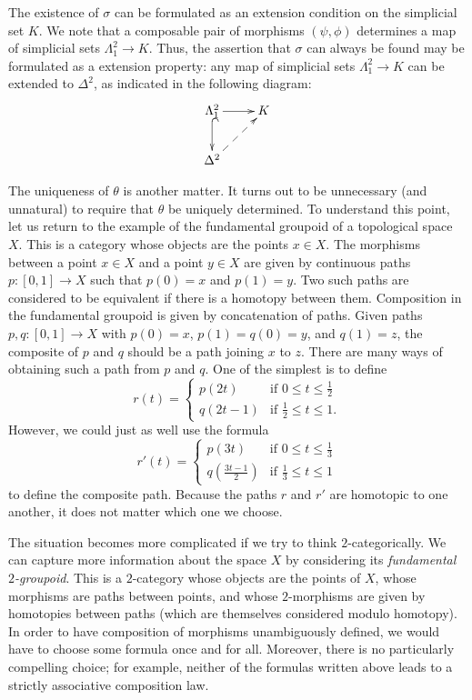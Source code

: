 \begin{1.1.2 inf-Categories}
The existence of $\sigma$ can be formulated as an extension condition on the simplicial set $K$.
We note that a composable pair of morphisms $(\psi, \phi)$ determines a map
of simplicial sets
$\Lambda^2_1 \rightarrow K$. Thus, the assertion that $\sigma$ can
always be found may be formulated as a extension property: any
map of simplicial sets $\Lambda^2_1 \rightarrow K$ can be extended to $\Delta^2$, as indicated in the following diagram:
$$ \xymatrix{ \Lambda^2_1\ar[r]\ar@{^{(}->}[d] & K \\
\Delta^2 \ar@{-->}[ur]}$$

The uniqueness of $\theta$ is another matter. It turns out to be
unnecessary (and unnatural) to require that $\theta$ be uniquely
determined. To understand this point, let us return to 
the example of the fundamental groupoid of a topological space
$X$. This is a category whose objects are the points $x \in X$.
The morphisms between a point $x \in X$ and a point $y \in X$ are given by
continuous paths $p: [0,1] \rightarrow X$ such that $p(0)=x$ and
$p(1)=y$. Two such paths are considered to be equivalent if there
is a homotopy between them. Composition in the fundamental
groupoid is given by concatenation of paths. Given paths $p,q:
[0,1] \rightarrow X$ with $p(0)=x$, $p(1)=q(0)=y$, and $q(1)=z$,
the composite of $p$ and $q$ should be a path joining $x$ to $z$.
There are many ways of obtaining such a path from $p$ and $q$. One
of the simplest is to define
$$r(t) = \begin{cases} p(2t) & \text{if } 0 \leq t \leq \frac{1}{2} \\
q(2t-1) & \text{if } \frac{1}{2} \leq t \leq 1. \end{cases}$$
However, we could just as well use the formula
$$r'(t) = \begin{cases} p(3t) & \text{if } 0 \leq t \leq \frac{1}{3} \\
q(\frac{3t-1}{2}) & \text{if } \frac{1}{3} \leq t \leq 1
\end{cases}$$
to define the composite path. Because the paths $r$ and $r'$ are homotopic to one another, it does not matter which one we choose.

The situation becomes more complicated if we try to think
$2$-categorically. We can capture more information about the space
$X$ by considering its {\it fundamental $2$-groupoid}. This is a
$2$-category whose objects are the points of $X$, whose morphisms
are paths between points, and whose $2$-morphisms are given by
homotopies between paths (which are themselves considered modulo
homotopy). In order to have composition of morphisms unambiguously defined, we would have to choose some formula once and for all.
Moreover, there is no particularly compelling choice; for example,
neither of the formulas written above leads to a strictly associative composition law.


\end{1.1.2 inf-Categories}
